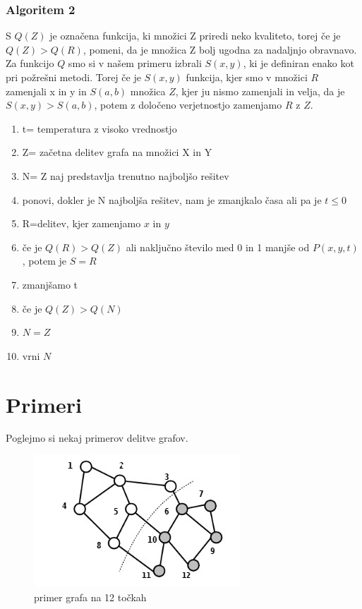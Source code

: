 \documentclass[12pt,a4paper]{amsart}
\theoremstyle{definition} %
\theoremstyle{plain} %
\begin{document}
\subsubsection{Algoritem 2}
S $Q(Z)$ je označena funkcija, ki množici Z priredi neko kvaliteto, torej če je $Q(Z) >Q(R)$, pomeni, da je množica Z bolj ugodna za nadaljnjo obravnavo.
Za funkcijo $Q$ smo si v našem primeru izbrali $S(x,y)$, ki je definiran enako kot pri požrešni metodi. Torej če je $S(x,y)$ funkcija, kjer smo v množici $R$ zamenjali x in y in $S(a,b)$ množica $Z$, kjer ju nismo zamenjali in velja, da je $S(x,y) > S(a,b)$, potem z določeno verjetnostjo zamenjamo $R$ z $Z$. 
\begin{enumerate}
\item t= temperatura z visoko vrednostjo
\item Z= začetna delitev grafa na množici X in Y 
\item N= Z  naj predstavlja trenutno najboljšo rešitev
\item ponovi, dokler je N najboljša rešitev, nam je zmanjkalo časa ali pa je $t \leq 0$
\item 			R=delitev, kjer zamenjamo $x$ in $y$
\item 			če je $Q(R)>Q(Z)$ ali naključno število med 0 in 1 manjše od $P(x,y,t)$, potem je $S=R$
\item 			zmanjšamo t
\item 			če je $Q(Z)>Q(N)$ 
\item 				$N=Z$
\item vrni $N$		
\end{enumerate}


\section{Primeri}
Poglejmo si nekaj primerov delitve grafov. 

\begin{figure}[h]
    \centering
    \includegraphics{prvi_graf} 
    \caption{primer grafa na 12 točkah}
    \label{fig:1_graf}
\end{figure}
\end{document}
